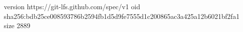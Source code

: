 version https://git-lfs.github.com/spec/v1
oid sha256:bdb25ce008593786b2594fb1d5d9fe7555d1c200865ac3a425a12b6021bf2fa1
size 2889
